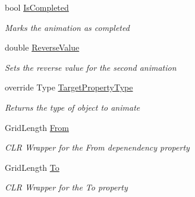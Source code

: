 \begin{DoxyCompactItemize}
\item 
bool \mbox{\hyperlink{class_wpf_handler_1_1_u_i_1_1_animations_1_1_grid_length_animation_a3884f38947db1a24ecc696b13a1e5ac4}{Is\+Completed}}
\begin{DoxyCompactList}\small\item\em Marks the animation as completed \end{DoxyCompactList}\item 
double \mbox{\hyperlink{class_wpf_handler_1_1_u_i_1_1_animations_1_1_grid_length_animation_ab18d4bb2c37fd3d38cd285e12db18871}{Reverse\+Value}}
\begin{DoxyCompactList}\small\item\em Sets the reverse value for the second animation \end{DoxyCompactList}\item 
override Type \mbox{\hyperlink{class_wpf_handler_1_1_u_i_1_1_animations_1_1_grid_length_animation_ac760bbe0c78eee7b3346f74f68024baa}{Target\+Property\+Type}}
\begin{DoxyCompactList}\small\item\em Returns the type of object to animate \end{DoxyCompactList}\item 
Grid\+Length \mbox{\hyperlink{class_wpf_handler_1_1_u_i_1_1_animations_1_1_grid_length_animation_a6985f4dbd3e753ed873302a37ff542fe}{From}}
\begin{DoxyCompactList}\small\item\em C\+LR Wrapper for the From depenendency property \end{DoxyCompactList}\item 
Grid\+Length \mbox{\hyperlink{class_wpf_handler_1_1_u_i_1_1_animations_1_1_grid_length_animation_a35b8e40718a9b06d82180d0e4aa9ffe0}{To}}
\begin{DoxyCompactList}\small\item\em C\+LR Wrapper for the To property \end{DoxyCompactList}\end{DoxyCompactItemize}
